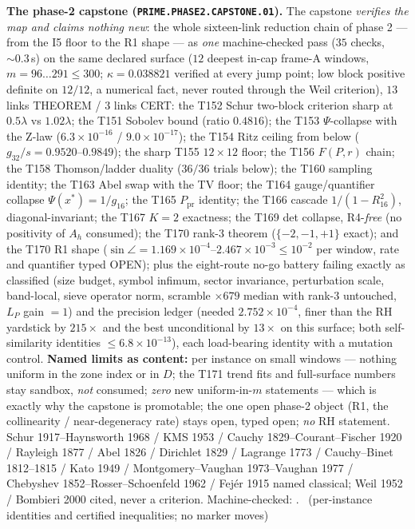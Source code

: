 \documentclass[11pt,a4paper]{article}
\theoremstyle{definition}
\begin{document}
\par\smallskip\noindent\textbf{The phase-2 capstone
(\texttt{PRIME.PHASE2.CAPSTONE.01}).}
The capstone \emph{verifies the map and claims nothing new}: the whole
sixteen-link reduction chain of phase 2 --- from the I5 floor to the R1
shape --- as \emph{one} machine-checked pass ($35$ checks,
${\sim}0.3$\,s) on the same declared surface ($12$ deepest in-cap
frame-A windows, $m=96\ldots291\le300$; $\kappa=0.038821$ verified at
every jump point; low block positive definite on $12/12$, a numerical
fact, never routed through the Weil criterion), $13$ links THEOREM /
$3$ links CERT: the T152 Schur two-block criterion sharp at
$0.5\lambda$ vs $1.02\lambda$; the T151 Sobolev bound (ratio
$0.4816$); the T153 $\Psi$-collapse with the Z-law
($6.3\times10^{-16}$ / $9.0\times10^{-17}$); the T154 Ritz ceiling
from below ($g_{32}/s=0.9520$--$0.9849$); the sharp T155 $12\times12$
floor; the T156 $F(P,r)$ chain; the T158 Thomson/ladder duality
($36/36$ trials below); the T160 sampling identity; the T163 Abel
swap with the TV floor; the T164 gauge/quantifier collapse
$\Psi(x^*)=1/g_{16}$; the T165 $P_{\mathrm{pr}}$ identity; the T166
cascade $1/(1-R_{16}^2)$, diagonal-invariant; the T167 $K=2$
exactness; the T169 det collapse, R4-\emph{free} (no positivity of
$A_h$ consumed); the T170 rank-3 theorem ($\{-2,-1,+1\}$ exact); and
the T170 R1 shape ($\sin\angle=1.169\times10^{-4}$--$2.467\times
10^{-3}\le10^{-2}$ per window, rate and quantifier typed OPEN); plus
the eight-route no-go battery failing exactly as classified (size
budget, symbol infimum, sector invariance, perturbation scale,
band-local, sieve operator norm, scramble $\times679$ median with
rank-3 untouched, $L_P$ gain $=1$) and the precision ledger (needed
$2.752\times10^{-4}$, finer than the RH yardstick by $215\times$ and
the best unconditional by $13\times$ on this surface; both
self-similarity identities $\le6.8\times10^{-13}$), each load-bearing
identity with a mutation control.
\textbf{Named limits as content:} per instance on small windows ---
nothing uniform in the zone index or in $D$; the T171 trend fits and
full-surface numbers stay sandbox, \emph{not} consumed; \emph{zero}
new uniform-in-$m$ statements --- which is exactly why the capstone is
promotable; the one open phase-2 object (R1, the collinearity /
near-degeneracy rate) stays open, typed open; \emph{no} RH statement.
Schur 1917--Haynsworth 1968 / KMS 1953 / Cauchy 1829--Courant--Fischer
1920 / Rayleigh 1877 / Abel 1826 / Dirichlet 1829 / Lagrange 1773 /
Cauchy--Binet 1812--1815 / Kato 1949 / Montgomery--Vaughan
1973--Vaughan 1977 / Chebyshev 1852--Rosser--Schoenfeld 1962 /
Fej\'er 1915 named classical; Weil 1952 / Bombieri 2000 cited, never a
criterion. Machine-checked:
.
\mE\ (per-instance identities and certified inequalities; no marker moves)
\par\smallskip
\end{document}
